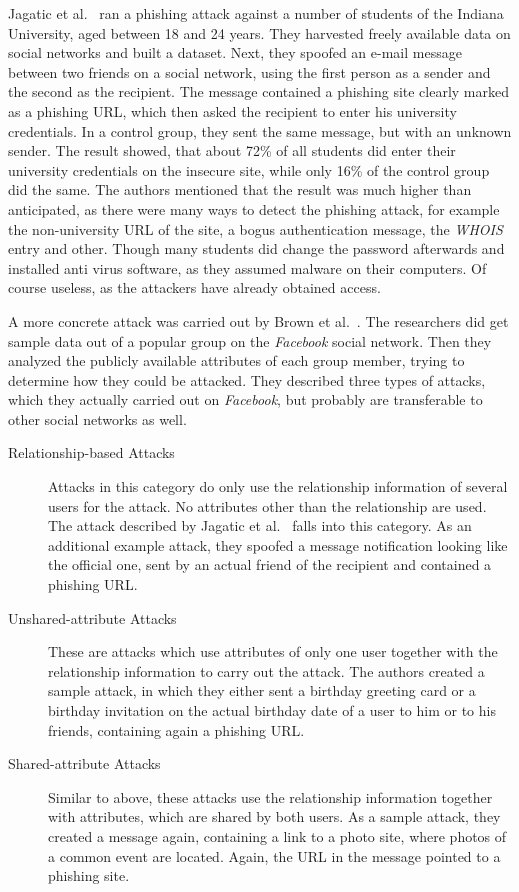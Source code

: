 Jagatic et al.~\cite{jagatic2007} ran a phishing attack against a number of
students of the Indiana University, aged between 18 and 24 years. They
harvested freely available data on social networks and built a dataset. Next,
they spoofed an e-mail message between two friends on a social network, using
the first person as a sender and the second as the recipient. The message
contained a phishing site clearly marked as a phishing URL, which then asked
the recipient to enter his university credentials. In a control group, they
sent the same message, but with an unknown sender. The result showed, that
about 72\% of all students did enter their university credentials on the
insecure site, while only 16\% of the control group did the same. The authors
mentioned that the result was much higher than anticipated, as there were many
ways to detect the phishing attack, for example the non-university URL of the
site, a bogus authentication message, the \textit{WHOIS} entry and other.
Though many students did change the password afterwards and installed anti
virus software, as they assumed malware on their computers. Of course useless,
as the attackers have already obtained access.

A more concrete attack was carried out by Brown et al.~\cite{brown2008}. The
researchers did get sample data out of a popular group on the \textit{Facebook}
social network. Then they analyzed the publicly available attributes of each
group member, trying to determine how they could be attacked. They described
three types of attacks, which they actually carried out on \textit{Facebook},
but probably are transferable to other social networks as well. 

\begin{description}
\item[Relationship-based Attacks]
Attacks in this category do only use the relationship information of several
users for the attack. No attributes other than the relationship are used. The
attack described by Jagatic et al.~\cite{jagatic2007} falls into this category. As an
additional example attack, they spoofed a message notification looking like the
official one, sent by an actual friend of the recipient and contained a
phishing URL.

\item[Unshared-attribute Attacks]
These are attacks which use attributes of only one user together
with the relationship information to carry out the attack. The authors created
a sample attack, in which they either sent a birthday greeting card or a
birthday invitation on the actual birthday date of a user to him or to his
friends, containing again a phishing URL.

\item[Shared-attribute Attacks]
Similar to above, these attacks use the relationship information together with
attributes, which are shared by both users. As a sample attack, they created
a message again, containing a link to a photo site, where photos of a common
event are located. Again, the URL in the message pointed to a phishing site.
\end{description}


